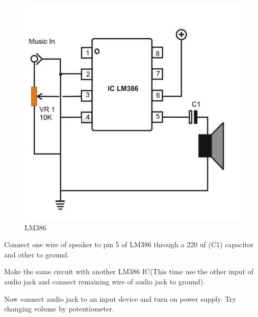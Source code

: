\documentclass[journal,12pt,twocolumn]{IEEEtran}
\begin{document}
\begin{figure}[h]
\centering
	\includegraphics[scale=0.4]{./figs/LM386.jpg}
	\caption{LM386}  \label{fig6}
    \end{figure}


\begin{problem}
Connect one  wire of speaker to pin 5 of LM386 through a 220 uf (C1) capacitor and other to ground.
\end{problem}
\begin{problem}
Make the same circuit with another LM386 IC(This time use the other input of audio jack and connect remaining wire of audio jack to ground).
\end{problem}
\begin{problem}
Now connect audio jack to an input device and turn on power supply. Try changing volume by potentiometer.
\end{problem}
\end{document}
